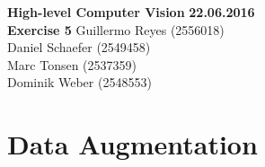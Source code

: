 \documentclass[12pt]{article}
\begin{document}

\noindent
{\Large \textbf{High-level Computer Vision}} \hfill \textbf{22.06.2016}\\
{\Large \textbf{Exercise 5}} 
\raggedleft \hfill Guillermo Reyes (2556018)\\
\hfill Daniel Schaefer (2549458)\\
\hfill Marc Tonsen (2537359)\\
\hfill Dominik Weber (2548553)\\

\raggedright



\section{Data Augmentation}
\end{document}
